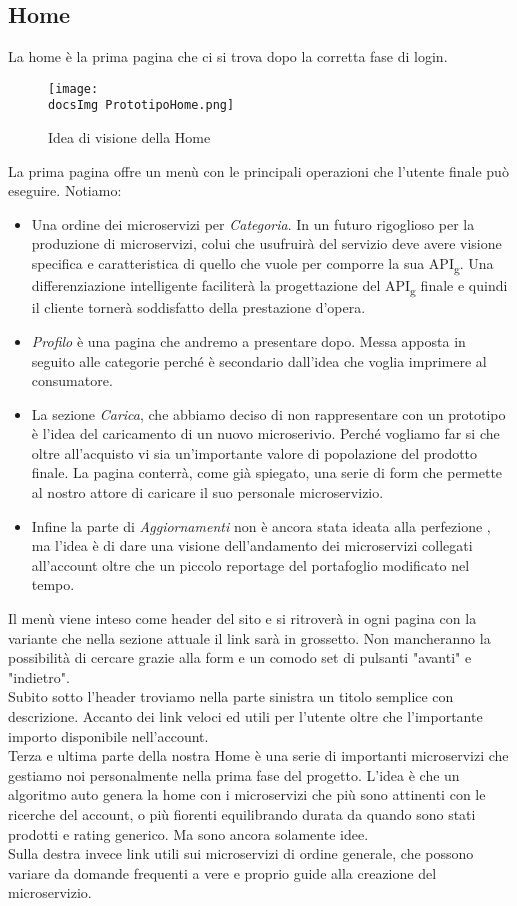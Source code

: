 {	\subsection{Home}{
		La home è la prima pagina che ci si trova dopo la corretta fase di login. \\
		\begin{figure}[H]
			\centering
			\texttt{[image: \\docsImg PrototipoHome.png]}
			\caption{Idea di visione della Home}
			\label{PrototipoHome}
		\end{figure}
		La prima pagina offre un menù con le principali operazioni che l'utente finale può eseguire. Notiamo:
		\begin{itemize}
			\item Una ordine dei microservizi per \textit{Categoria}. In un futuro rigoglioso per la produzione di microservizi, colui che usufruirà del servizio deve avere visione specifica e caratteristica di quello che vuole per comporre la sua API\textsubscript{g}. Una differenziazione intelligente faciliterà la progettazione del API\textsubscript{g} finale e quindi il cliente tornerà soddisfatto della prestazione d'opera.
			\item \textit{Profilo} è una pagina che andremo a presentare dopo. Messa apposta in seguito alle categorie perché è secondario dall'idea che voglia imprimere al consumatore.
			\item La sezione \textit{Carica}, che abbiamo deciso di non rappresentare con un prototipo è l'idea del caricamento di un nuovo microserivio. Perché vogliamo far si che oltre all'acquisto vi sia un'importante valore di popolazione del prodotto finale. La pagina conterrà, come già spiegato, una serie di form che permette al nostro attore di caricare il suo personale microservizio.
			\item Infine la parte di \textit{Aggiornamenti} non è ancora stata ideata alla perfezione , ma l'idea è di dare una visione dell'andamento dei microservizi collegati all'account oltre che un piccolo reportage del portafoglio modificato nel tempo.
		\end{itemize}
		Il menù viene inteso come header del sito e si ritroverà in ogni pagina con la variante che nella sezione attuale il link sarà in grossetto. Non mancheranno la possibilità di cercare grazie alla form e un comodo set di pulsanti "avanti" e "indietro".\\
		Subito sotto l'header troviamo nella parte sinistra un titolo semplice con descrizione. Accanto dei link veloci ed utili per l'utente oltre che l'importante importo disponibile nell'account.\\
		Terza e ultima parte della nostra Home è una serie di importanti microservizi che gestiamo noi personalmente nella prima fase del progetto. L'idea è che un algoritmo auto genera la home con i microservizi che più sono attinenti con le ricerche del account, o più fiorenti equilibrando durata da quando sono stati prodotti e rating generico. Ma sono ancora solamente idee.\\
		Sulla destra invece link utili sui microservizi di ordine generale, che possono variare da domande frequenti a vere e proprio guide alla creazione del microservizio.
	}
	
}
